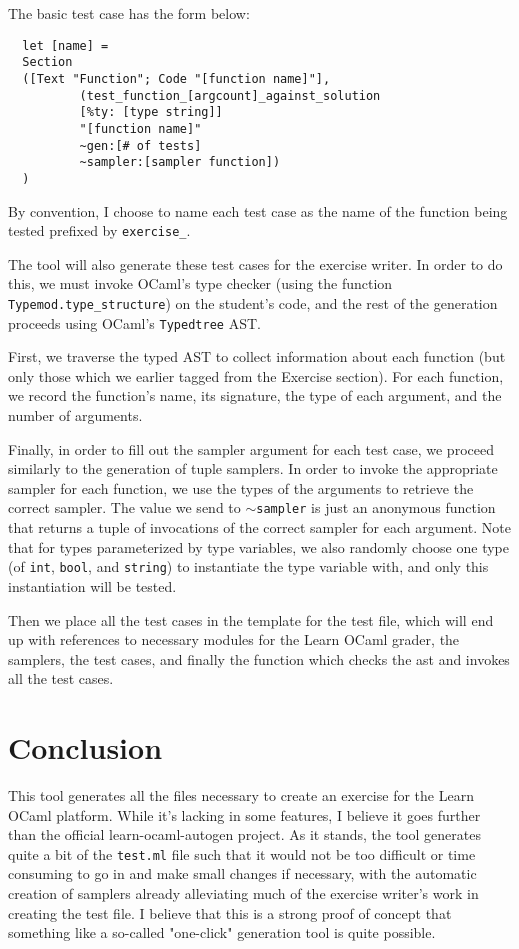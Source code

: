 \documentclass[11pt]{article}
\begin{document}
The basic test case has the form below:

\begin{lstlisting}
  let [name] =
  Section
  ([Text "Function"; Code "[function name]"],
          (test_function_[argcount]_against_solution
          [%ty: [type string]]
          "[function name]"
          ~gen:[# of tests]
          ~sampler:[sampler function])
  )
\end{lstlisting}

By convention, I choose to name each test case as the name of the function being tested prefixed by \verb+exercise_+. 

The tool will also generate these test cases for the exercise writer. In order to do this, we must invoke OCaml's type checker (using the function \verb+Typemod.type_structure+) on the student's code, and the rest of the generation proceeds using OCaml's \verb+Typedtree+ AST.

First, we traverse the typed AST to collect information about each function (but only those which we earlier tagged from the Exercise section). For each function, we record the function's name, its signature, the type of each argument, and the number of arguments.

Finally, in order to fill out the sampler argument for each test case, we proceed similarly to the generation of tuple samplers. In order to invoke the appropriate sampler for each function, we use the types of the arguments to retrieve the correct sampler. The value we send to $\sim$\verb+sampler+ is just an anonymous function that returns a tuple of invocations of the correct sampler for each argument. Note that for types parameterized by type variables, we also randomly choose one type (of \verb+int+, \verb+bool+, and \verb+string+) to instantiate the type variable with, and only this instantiation will be tested.

Then we place all the test cases in the template for the test file, which will end up with references to necessary modules for the Learn OCaml grader, the samplers, the test cases, and finally the function which checks the ast and invokes all the test cases.

\section{Conclusion}
This tool generates all the files necessary to create an exercise for the Learn OCaml platform. While it's lacking in some features, I believe it goes further than the official learn-ocaml-autogen project. As it stands, the tool generates quite a bit of the \verb+test.ml+ file such that it would not be too difficult or time consuming to go in and make small changes if necessary, with the automatic creation of samplers already alleviating much of the exercise writer's work in creating the test file. I believe that this is a strong proof of concept that something like a so-called "one-click" generation tool is quite possible.
\end{document}
